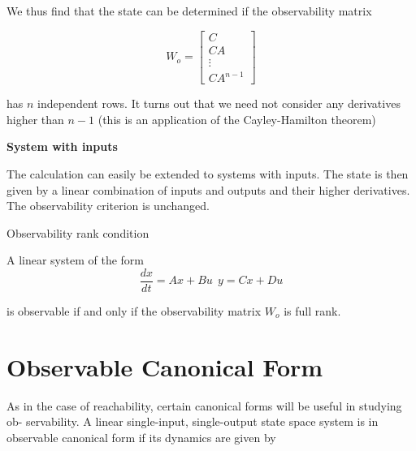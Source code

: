 We thus find that the state can  be  determined if the observability matrix
 
\begin{equation}
W_o= 
\begin{bmatrix}
 C \\
 CA \\
 \vdots \\
 CA^{n-1} 
\end{bmatrix}
\end{equation}

has $n$ independent rows.  It turns out  that  we  need  not consider any derivatives higher
than $n-1$ (this is an application of the Cayley-Hamilton theorem)
 
\begin{framed}
\theoremstyle{remark}
\begin{remark}{\textbf{System with inputs}}

The calculation can easily be extended to systems with inputs. The state is then
given by a linear combination of inputs and outputs and their higher derivatives.
The observability criterion is unchanged. 
\end{remark}
\end{framed}


\begin{framed}
\theoremstyle{theorem}
\begin{theorem}{Observability rank condition}

A linear system of the form  
\begin{equation}
\frac{dx}{dt} = Ax + Bu ~~ y = Cx + Du \nonumber
\end{equation}

is observable if and only if the observability matrix $W_o$ is full rank.
\end{theorem}
\end{framed}



\section{Observable Canonical Form}
\label{observability_canonical_form}

As in the case of reachability, certain canonical forms will be useful in studying ob-
servability. A linear single-input, single-output state space system is in observable
canonical form if its dynamics are given by


